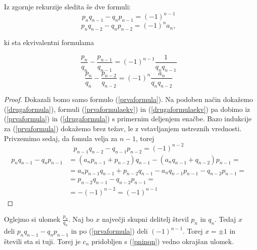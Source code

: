 \documentclass[a4paper,12pt]{article}
\theoremstyle{definition}
\theoremstyle{proposition}
\theoremstyle{theorem}
\theoremstyle{lemma}
\begin{document}
\vspace{5mm}

Iz zgornje rekurzije sledita še dve formuli:
\begin{equation}
\label{prvaformula}
p_n q_{n-1} - q_n p_{n-1} = (-1)^{n-1}
\end{equation}
\begin{equation}
\label{drugaformula}
p_n q_{n-2} - q_n p_{n-2} = (-1)^n a_n,
\end{equation}

ki sta ekvivalentni formulama

\begin{equation}
\label{prvaformulaekv}
\frac{p_n}{q_n} - \frac{p_{n-1}}{q_{n-1}} = (-1)^{n-1}\frac{1}{q_n q_{n-1}}
\end{equation}
\begin{equation}
\label{drugaformulaekv}
\frac{p_n}{q_n} - \frac{p_{n-2}}{q_{n-2}} = (-1)^{n}\frac{a_n}{q_n q_{n-2}}
\end{equation}

\begin{proof}
Dokazali bomo samo formulo (\ref{prvaformula}). Na podoben način dokažemo (\ref{drugaformula}), formuli (\ref{prvaformulaekv}) in (\ref{drugaformulaekv}) pa dobimo iz (\ref{prvaformula}) in (\ref{drugaformula}) s primernim deljenjem enačbe.
Bazo indukcije za (\ref{prvaformula}) dokažemo brez težav, le z vstavljanjem ustreznih vrednosti. Privzemimo sedaj, da fomula velja za $n-1$, torej 
\[ p_{n-1} q_{n-2} - q_{n-1} p_{n-2} = (-1)^{n-2} \]
\begin{equation*}
\begin{split}
p_n q_{n-1} - q_n p_{n-1} &= (a_{n}p_{n-1} + p_{n-2}) q_{n-1} - (a_{n}q_{n-1} + q_{n-2}) p_{n-1} = \\
&= a_{n}p_{n-1}q_{n-1} + p_{n-2} q_{n-1} - a_{n}q_{n-1}p_{n-1} - q_{n-2} p_{n-1} = \\
&= p_{n-2} q_{n-1} - q_{n-2} p_{n-1} = \\
&= -(-1)^{n-2} = (-1)^{n-1}
\end{split}
\end{equation*}
\end{proof}

Oglejmo si ulomek $\frac{p_n}{q_n}$. Naj bo $x$ največji skupni delitelj števil $p_n$ in $q_n$. Tedaj $x$ deli $p_n q_{n-1} - q_n p_{n-1}$ in po (\ref{prvaformula}) deli $(-1)^{n-1}$. Torej $x= \pm 1$ in števili sta si tuji. Torej je $c_n$  pridobljen s (\ref{pninqn}) vedno okrajšan ulomek.\\
\end{document}
